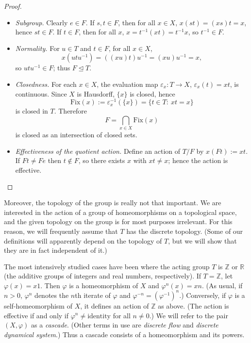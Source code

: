 \begin{proof}~
    \begin{itemize}
        \item \emph{Subgroup.}
              Clearly $e\in F$. If $s,t\in F$, then for all $x\in X$, $x(st)=(xs)t=x$, hence $st\in F$.
              If $t\in F$, then for all $x$, $x=t^{-1}(xt)=t^{-1}x$, so $t^{-1}\in F$.

        \item \emph{Normality.}
              For $u\in T$ and $t\in F$, for all $x\in X$,
              \[
                  x(utu^{-1})=((xu)t)u^{-1}=(xu)u^{-1}=x,
              \]
              so $utu^{-1}\in F$; thus $F\trianglelefteq T$.

        \item \emph{Closedness.}
              For each $x\in X$, the evaluation map $\varepsilon_x:T\to X$, $\varepsilon_x(t)=xt$, is continuous.
              Since $X$ is Hausdorff, $\{x\}$ is closed, hence
              \[
                  \mathrm{Fix}(x):=\varepsilon_x^{-1}(\{x\})=\{t\in T:\ xt=x\}
              \]
              is closed in $T$. Therefore
              \[
                  F=\bigcap_{x\in X}\mathrm{Fix}(x)
              \]
              is closed as an intersection of closed sets.

        \item \emph{Effectiveness of the quotient action.}
              Define an action of $T/F$ by $x(Ft):=xt$. If $Ft\neq Fe$ then $t\notin F$, so there exists $x$ with $xt\neq x$; hence the action is effective.
    \end{itemize}




\end{proof}


Moreover, the topology of the group is really not that important. We are interested in the action of a group of homeomorphisms on a topological space, and the given topology on the group is for most purposes irrelevant. For this reason, we will frequently assume that $T$ has the discrete topology. (Some of our definitions will apparently depend on the topology of $T$, but we will show that they are in fact independent of it.)


The most intensively studied cases have been where the acting group $T$ is $\mathbb{Z}$ or $\mathbb{R}$ (the additive groups of integers and real numbers, respectively). If $T = \mathbb{Z}$, let $\varphi(x) = x1$. Then $\varphi$ is a homeomorphism of $X$ and $\varphi^{n}(x) = xn$. (As usual, if $n > 0$, $\varphi^{n}$ denotes the $n$th iterate of $\varphi$ and $\varphi^{-n} = (\varphi^{-1})^{n}$.) Conversely, if $\varphi$ is a self-homeomorphism of $X$, it defines an action of $\mathbb{Z}$ as above. (The action is effective if and only if $\varphi^{n} \neq \text{identity}$ for all $n \neq 0$.) We will refer to the pair $(X, \varphi)$ as a \emph{cascade}. (Other terms in use are \emph{discrete flow} and \emph{discrete dynamical system}.) Thus a cascade consists of a homeomorphism and its powers.

